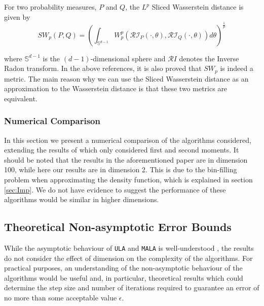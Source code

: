 \begin{defn}
For two probability measures, $P$ and $Q$, the $L^p$ Sliced Wasserstein distance is given by
$$
SW_p(P,Q) = \left(\int_{\mathbb S^{d-1} }  W_p^p\left(\mathcal{RI}_P(\cdot, \theta), \mathcal{RI}_Q(\cdot, \theta) \right) d \theta \right)^{\frac 1 p}
$$
\end{defn}

where $\mathbb S^{d-1}$ is the $(d-1)$-dimensional sphere and $\mathcal RI$ denotes the Inverse Radon transform. In the above references, it is also proved that $SW_p$ is indeed a metric. The main reason why we can use the Sliced Wasserstein distance as an approximation to the Wasserstein distance is that these two metrics are equivalent\cite{Santa}.

\subsubsection{Numerical Comparison}
In this section we present a numerical comparison of the algorithms considered, extending the results of \cite{Brosse18tULA} which only considered first and second moments.  It should be noted that the results in the aforementioned paper are in dimension 100, while here our results are in dimension 2.  This is due to the bin-filling problem when approximating the density function, which is explained in section \ref{sec:Imp}.  We do not have evidence to suggest the performance of these algorithms would be similar in higher dimensions.



\subsection{Theoretical Non-asymptotic Error Bounds}

While the asymptotic behaviour of \texttt{ULA} and \texttt{MALA} is well-understood \cite{RT96}, the results do not consider the effect of dimension on the complexity of the algorithms.  For practical purposes, an understanding of the non-asymptotic behaviour of the algorithms would be useful and, in particular, theoretical results which could determine the step size and number of iterations required to guarantee an error of no more than some acceptable value $\epsilon$.

